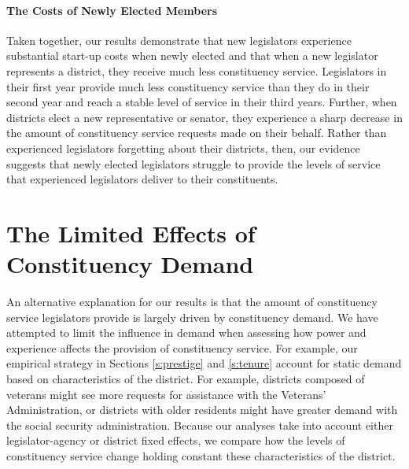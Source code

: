 \documentclass{article}
\begin{document}
\paragraph{The Costs of Newly Elected Members} Taken together, our results demonstrate that new legislators experience substantial start-up costs when newly elected and that when a new legislator represents a district, they receive much less constituency service.  Legislators in their first year provide much less constituency service than they do in their second year and reach a stable level of service in their third years.  Further, when districts elect a new representative or senator, they experience a sharp decrease in the amount of constituency service requests made on their behalf.  Rather than experienced legislators forgetting about their districts, then, our evidence suggests that newly elected legislators struggle to provide the levels of service that experienced legislators deliver to their constituents.  
 


\section{The Limited Effects of Constituency Demand}\label{s:demand} 

An alternative explanation for our results is that the amount of constituency service legislators provide is largely driven by constituency demand.  We have attempted to limit the influence in demand when assessing how power and experience affects the provision of constituency service.  For example, our empirical strategy in Sections \ref{s:prestige} and \ref{s:tenure} account for static demand based on characteristics of the district.  For example, districts composed of veterans might see more requests for assistance with the Veterans' Administration, or districts with older residents might have greater demand with the social security administration.  Because our analyses take into account either legislator-agency or district fixed effects, we compare how the levels of constituency service change holding constant these characteristics of the district.  
\end{document}

